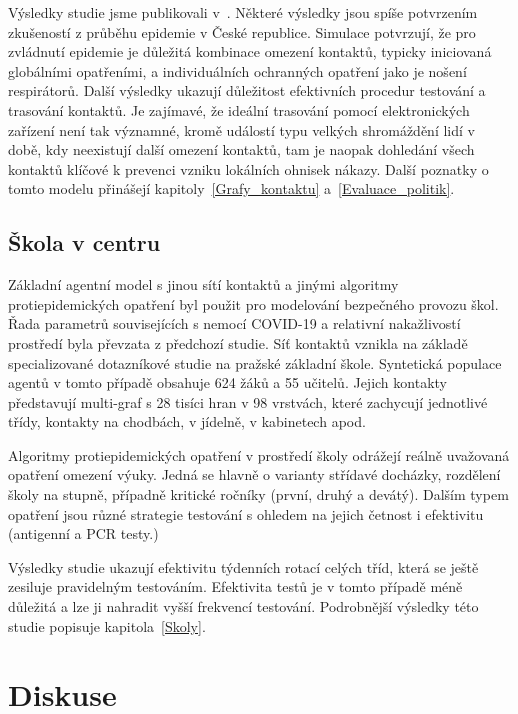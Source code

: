 Výsledky studie jsme publikovali v~\cite{M-techrep2021}. Některé výsledky jsou spíše potvrzením zkušeností z průběhu epidemie v České republice. Simulace potvrzují, že pro zvládnutí epidemie je důležitá kombinace omezení kontaktů, typicky iniciovaná globálními opatřeními, a individuálních ochranných opatření jako je nošení respirátorů. Další výsledky ukazují důležitost efektivních procedur testování a trasování kontaktů. Je zajímavé, že ideální trasování pomocí elektronických zařízení není tak významné, kromě událostí typu velkých shromáždění lidí v době, kdy neexistují další omezení kontaktů, tam je naopak dohledání všech kontaktů klíčové k prevenci vzniku lokálních ohnisek nákazy. Další poznatky o tomto modelu přinášejí kapitoly~\ref{Grafy_kontaktu}
a~\ref{Evaluace_politik}.


\subsection*{Škola v centru}

Základní agentní model s jinou sítí kontaktů a jinými algoritmy protiepidemických opatření byl použit pro modelování bezpečného provozu škol. Řada parametrů souvisejících s nemocí COVID-19 a relativní nakažlivostí prostředí byla převzata z předchozí studie. Síť kontaktů vznikla na základě specializované dotazníkové studie na pražské základní škole. Syntetická populace agentů v tomto případě obsahuje 624 žáků a 55 učitelů. Jejich kontakty představují multi-graf s 28 tisíci hran v 98 vrstvách, které zachycují jednotlivé třídy, kontakty na chodbách, v jídelně, v kabinetech apod. 

Algoritmy protiepidemických opatření v prostředí školy odrážejí reálně uvažovaná opatření omezení výuky. Jedná se hlavně o varianty střídavé docházky, rozdělení školy na stupně, případně kritické ročníky (první, druhý a devátý). Dalším typem opatření jsou různé strategie testování s ohledem na jejich četnost i efektivitu (antigenní a PCR testy.)

Výsledky studie ukazují efektivitu týdenních rotací celých tříd, která se ještě zesiluje pravidelným testováním. Efektivita testů je v tomto případě méně důležitá a lze ji nahradit vyšší frekvencí testování. Podrobnější výsledky této studie popisuje kapitola~\ref{Skoly}.







\section*{Diskuse} 

